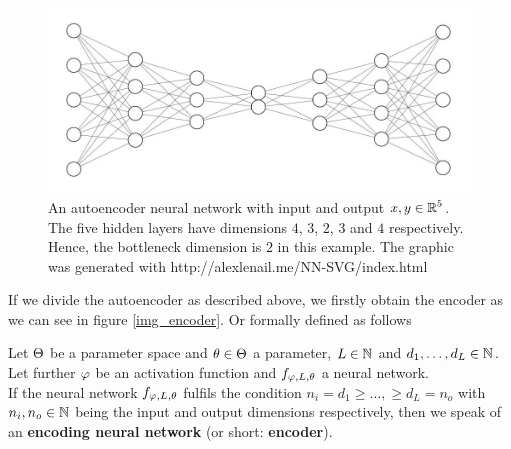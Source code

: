 \begin{figure}
\begin{center}
   \begin{minipage}[b]{0.9\linewidth}
      \includegraphics[width=\linewidth]{autoencoder}
      \caption{An autoencoder neural network with input and output $x, y\in \operatorname{\mathbb{R}}^5$. The five hidden layers have dimensions $4$, $3$, $2$, $3$ and $4$ respectively. Hence, the bottleneck dimension is $2$ in this example. The graphic was generated with http://alexlenail.me/NN-SVG/index.html}\label{autoencoder}
	\end{minipage}
\end{center}
\end{figure}


If we divide the autoencoder as described above, we firstly obtain the encoder as we can see in figure \ref{img_encoder}. Or formally defined as follows

\begin{lemma}\label{def_encoder}
Let $\operatorname{\Theta}$ be a parameter space and $\theta \in \operatorname{\Theta}$ a parameter, $L\in \operatorname{\mathbb{N}}$ and $d_1,\ldots, d_L\in\operatorname{\mathbb{N}}$. Let further $\operatorname{\varphi}$ be an activation function and $f_{\operatorname{\varphi},L,\theta}$ a neural network.\\
If the neural network $f_{\operatorname{\varphi},L,\theta}$ fulfils the condition $n_i= d_1 \geq \ldots, \geq d_L = n_o$ with $n_i, n_o \in \operatorname{\mathbb{N}}$ being the input and output dimensions respectively, then we speak of an \textbf{encoding neural network} (or short: \textbf{encoder}).
\end{lemma}



